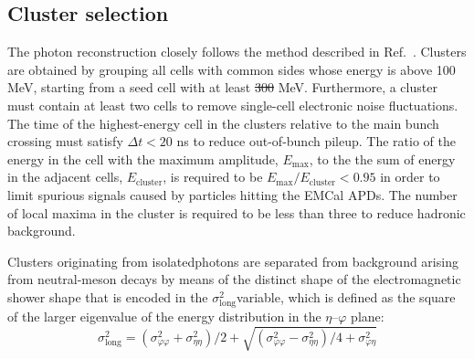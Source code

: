 \documentclass[ALICE,manyauthors]{cernphprep}
\newcommand{\lambdasquare}{\ensuremath{\sigma^{2}_{\mathrm{long}}}}
\newcommand{\pt}           {\ensuremath{p_{\rm T}}\xspace}
\providecommand{\DIFaddtex}[1]{{\protect\color{blue}\uwave{#1}}} %
\providecommand{\DIFdeltex}[1]{{\protect\color{red}\sout{#1}}}                      %
\providecommand{\DIFaddbegin}{} %
\providecommand{\DIFaddend}{} %
\providecommand{\DIFdelbegin}{} %
\providecommand{\DIFdelend}{} %
\providecommand{\DIFadd}[1]{\texorpdfstring{\DIFaddtex{#1}}{#1}} %
\providecommand{\DIFdel}[1]{\texorpdfstring{\DIFdeltex{#1}}{}} %
\newcommand{\DIFscaledelfig}{0.5}
\newlength{\DIFdelgraphicswidth} %
\newlength{\DIFdelgraphicsheight} %
\newcommand{\DIFaddincludegraphics}[2][]{{\color{blue}\fbox{\DIFOincludegraphics[#1]{#2}}}} %
\newcommand{\DIFdelincludegraphics}[2][]{%
\sbox{\DIFdelgraphicsbox}{\DIFOincludegraphics[#1]{#2}}%
\settoboxwidth{\DIFdelgraphicswidth}{\DIFdelgraphicsbox} %
\settoboxtotalheight{\DIFdelgraphicsheight}{\DIFdelgraphicsbox} %
\scalebox{\DIFscaledelfig}{%
\parbox[b]{\DIFdelgraphicswidth}{\usebox{\DIFdelgraphicsbox}\\[-\baselineskip] \rule{\DIFdelgraphicswidth}{0em}}\llap{\resizebox{\DIFdelgraphicswidth}{\DIFdelgraphicsheight}{%
\setlength{\unitlength}{\DIFdelgraphicswidth}%
\begin{picture}(1,1)%
\thicklines\linethickness{2pt} %
{\color[rgb]{1,0,0}\put(0,0){\framebox(1,1){}}}%
{\color[rgb]{1,0,0}\put(0,0){\line( 1,1){1}}}%
{\color[rgb]{1,0,0}\put(0,1){\line(1,-1){1}}}%
\end{picture}%
}\hspace*{3pt}}} %
} %
\DeclareRobustCommand{\DIFaddbegin}{\DIFOaddbegin \let\includegraphics\DIFaddincludegraphics} %
\DeclareRobustCommand{\DIFaddend}{\DIFOaddend \let\includegraphics\DIFOincludegraphics} %
\DeclareRobustCommand{\DIFdelbegin}{\DIFOdelbegin \let\includegraphics\DIFdelincludegraphics} %
\DeclareRobustCommand{\DIFdelend}{\DIFOaddend \let\includegraphics\DIFOincludegraphics} %
\begin{document}
\DIFaddend \subsection{Cluster selection}
The photon reconstruction closely follows the method described in Ref.~\cite{Acharya:2019jkx}. Clusters are obtained by grouping all cells with common sides whose energy is above {100 MeV}, starting from a seed cell with at least {\DIFdelbegin \DIFdel{300 }\DIFdelend \DIFaddbegin \DIFadd{500 }\DIFaddend MeV}. Furthermore, a cluster must contain at least two cells 
to remove single-cell electronic noise fluctuations. The time of the highest-energy cell in the clusters relative to the main bunch crossing must satisfy $\Delta t < 20$ ns to reduce out-of-bunch pileup. The ratio of the energy in the cell with the maximum amplitude, $E_{\mathrm{max}}$, to the the sum of energy in the adjacent cells, $E_{\mathrm{cluster}}$, is required to be $E_{\mathrm{max}}/E_{\mathrm{cluster}}<0.95$ in order to limit spurious signals caused by particles hitting the EMCal APDs. The number of local maxima in the cluster is required to be less than three to reduce hadronic background.

Clusters originating from isolated\DIFaddbegin \DIFadd{, prompt }\DIFaddend photons are separated from background arising from neutral-meson decays by means of the distinct shape of the electromagnetic shower shape that is encoded in the \lambdasquare variable, which is defined as the square of the larger eigenvalue of the energy distribution in the $\eta$--$\varphi$ plane:
\begin{equation}
\lambdasquare = (\sigma^{2}_{\varphi\varphi} + \sigma^{2}_{\eta\eta})/2 + \sqrt{(\sigma^{2}_{\varphi\varphi} - \sigma^{2}_{\eta\eta})/4 + \sigma^{2}_{\varphi\eta}}
\end{equation}
\end{document}

